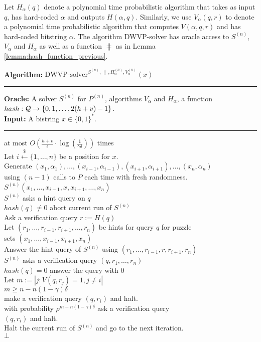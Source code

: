 Let $H_{\alpha}(q)$ denote a polynomial time probabilistic algorithm that takes as input $q$,
has hard-coded $\alpha$ and outputs $H(\alpha, q)$.
Similarly, we use $V_{\alpha}(q,r)$ to denote a polynomial time probabilistic algorithm that computes $V(\alpha, q, r)$ and has hard-coded bitstring $\alpha$.
The algorithm DWVP-solver has oracle access to $S^{(n)}$, $V_{\alpha}$ and $H_{\alpha}$ as well as a function $\hash$ as in Lemma \ref{lemma:hash_function_previous}.
%
\begin{codeblock}
  \textbf{Algorithm:} $\text{DWVP-solver}^{S^{(n)}, \hash, H_{\alpha}^{(n)}, V_{\alpha}^{(n)}}(x)$
  \medskip
  \hrule
  \textbf{Oracle:}  A solver $S^{(n)}$ for $P^{(n)}$, algorithms $V_{\alpha}$ and $H_{\alpha}$, a function $hash : \mathcal{Q} \rightarrow \{0,1, \dotsc, 2(h+v)-1\}$.\\
  \textbf{Input:} A bistring $x \in \{0,1\}^{*}$.
  \medskip\hrule
  \Repeat at most $O(\frac{h+v}{\epsilon} \cdot \log(\frac{1}{\gamma\delta}))$ times \\
  \IndI Let $i \xleftarrow{\$} \{1, \dotsc, n\}$ be a position for $x$.\\
  \IndI Generate $(x_1, \alpha_1), \dotsc, (x_{i-1}, \alpha_{i-1}), (x_{i+1}, \alpha_{i+1}), \dotsc, (x_n, \alpha_n)$ \\
  \IndI using $(n-1)$ calls to $P$ each time with fresh randomness.\\
  \IndI \Run $S^{(n)}(x_1, \dotsc, x_{i-1}, x, x_{i+1}, \dotsc, x_n)$\\
  \IndII \If $S^{(n)}$ asks a hint query on $q$ \Then \\
  \IndIII \If $hash(q) \neq 0$ \Then abort current run of $S^{(n)}$\\
  \IndIII Ask a verification query $r := H(q)$\\
  \IndIII Let $(r_1, \dotsc, r_{i-1}, r_{i+1}, \dotsc, r_{n})$ be hints for query $q$ for puzzle\\
  \IndIII sets $(x_1, \dotsc, x_{i-1}, x_{i+1}, x_n)$\\
  \IndIII Answer the hint query of $S^{(n)}$ using $(r_1, \dots, r_{i-1}, r, r_{i+1}, r_n)$\\
  \IndII \If $S^{(n)}$ asks a verification query $(q, r_1, \dots, r_n)$ \Then \\
  \IndIII \If $hash(q) = 0$ \Then answer the query with $0$\\
  \IndIII Let $m := |j: V(q,r_j) = 1, j \neq i|$\\
  \IndIII \If $m \geq n - n(1-\gamma)\delta$ \Then \\
  \IndIIII make a verification query $(q, r_i)$ and halt.\\
  \IndIII \Else with probability $\rho^{m - n(1-\gamma)\delta}$ ask a verification query \\
  \IndIIII $(q, r_i)$ and halt. \\
  \IndIII Halt the current run of $S^{(n)}$ and go to the next iteration.\\
  \Return $\bot$
\end{codeblock}

